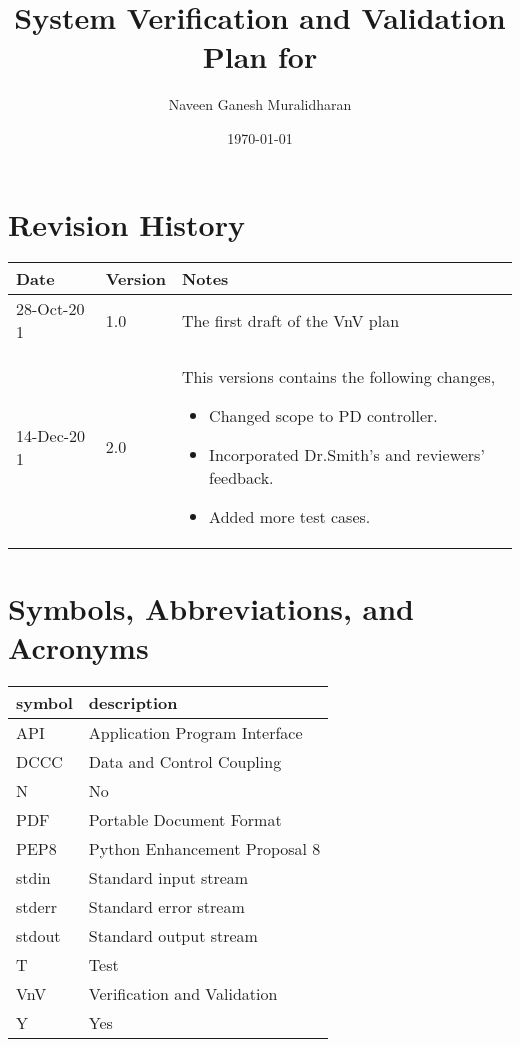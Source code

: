 \documentclass[12pt, titlepage]{article}
\begin{document}
\title{System Verification and Validation Plan for \progname{}} 
\author{Naveen Ganesh Muralidharan}
\date{\today}
	
\maketitle


\section{Revision History}

\begin{tabularx}{\textwidth}{p{3cm}p{2cm}X}
\toprule {\bf Date} & {\bf Version} & {\bf Notes}\\
\midrule
28-Oct-20 1 & 1.0 & The first draft of the VnV plan\\
14-Dec-20 1 & 2.0 & This versions contains the following changes,
\begin{itemize}
\item Changed scope to PD controller.
\item Incorporated Dr.Smith's and reviewers' feedback.
\item Added more test cases.
\end{itemize}
\\
\bottomrule
\end{tabularx}

\newpage

\tableofcontents

\listoftables

\newpage

\section{Symbols, Abbreviations, and Acronyms}

\renewcommand{\arraystretch}{1.2}
\begin{tabular}{l l} 
  \toprule		
  \textbf{symbol} & \textbf{description}\\
  \midrule 
  API & Application Program Interface\\
  DCCC & Data and Control Coupling\\
  N & No\\
  PDF & Portable Document Format \\
  PEP8 & Python Enhancement Proposal 8\\
  stdin & Standard input stream\\
  stderr & Standard error stream\\
  stdout & Standard output stream\\
  T & Test\\
  VnV & Verification and Validation\\
  Y & Yes\\
  \bottomrule
\end{tabular}\\
\end{document}
